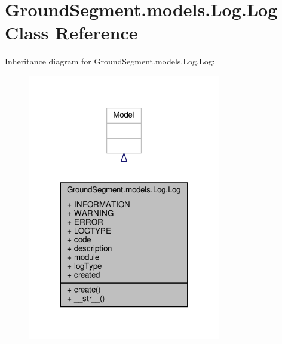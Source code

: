 \hypertarget{class_ground_segment_1_1models_1_1_log_1_1_log}{}\section{Ground\+Segment.\+models.\+Log.\+Log Class Reference}
\label{class_ground_segment_1_1models_1_1_log_1_1_log}


Inheritance diagram for Ground\+Segment.\+models.\+Log.\+Log\+:\nopagebreak
\begin{figure}[H]
\begin{center}
\leavevmode
\includegraphics[width=239pt]{class_ground_segment_1_1models_1_1_log_1_1_log__inherit__graph}
\end{center}
\end{figure}



